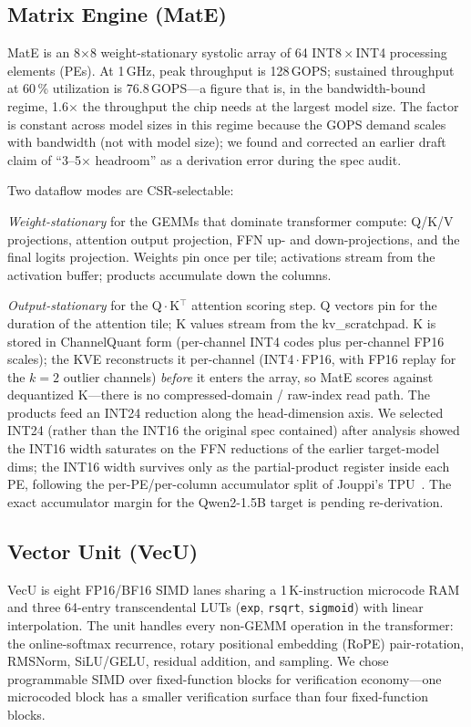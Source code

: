 \documentclass[conference]{IEEEtran}
\begin{document}
\subsection{Matrix Engine (MatE)}

MatE is an 8$\times$8 weight-stationary systolic array of 64 INT8\,$\times$\,INT4 processing elements (PEs). At 1\,GHz, peak throughput is 128\,GOPS; sustained throughput at 60\,\% utilization is 76.8\,GOPS---a figure that is, in the bandwidth-bound regime, 1.6$\times$ the throughput the chip needs at the largest model size. The factor is constant across model sizes in this regime because the GOPS demand scales with bandwidth (not with model size); we found and corrected an earlier draft claim of ``3--5$\times$ headroom'' as a derivation error during the spec audit.

Two dataflow modes are CSR-selectable:

\textit{Weight-stationary} for the GEMMs that dominate transformer compute: Q/K/V projections, attention output projection, FFN up- and down-projections, and the final logits projection. Weights pin once per tile; activations stream from the activation buffer; products accumulate down the columns.

\textit{Output-stationary} for the Q\,$\cdot$\,K$^\top$ attention scoring step. Q vectors pin for the duration of the attention tile; K values stream from the kv\_scratchpad. K is stored in ChannelQuant form (per-channel INT4 codes plus per-channel FP16 scales); the KVE reconstructs it per-channel (INT4\,$\cdot$\,FP16, with FP16 replay for the $k{=}2$ outlier channels) \emph{before} it enters the array, so MatE scores against dequantized K---there is no compressed-domain / raw-index read path. The products feed an INT24 reduction along the head-dimension axis. We selected INT24 (rather than the INT16 the original spec contained) after analysis showed the INT16 width saturates on the FFN reductions of the earlier target-model dims; the INT16 width survives only as the partial-product register inside each PE, following the per-PE/per-column accumulator split of Jouppi's TPU~\cite{jouppi_tpu,tpu_v4}. The exact accumulator margin for the Qwen2-1.5B target is pending re-derivation.

\subsection{Vector Unit (VecU)}

VecU is eight FP16/BF16 SIMD lanes sharing a 1\,K-instruction microcode RAM and three 64-entry transcendental LUTs (\texttt{exp}, \texttt{rsqrt}, \texttt{sigmoid}) with linear interpolation. The unit handles every non-GEMM operation in the transformer: the online-softmax recurrence, rotary positional embedding (RoPE) pair-rotation, RMSNorm, SiLU/GELU, residual addition, and sampling. We chose programmable SIMD over fixed-function blocks for verification economy---one microcoded block has a smaller verification surface than four fixed-function blocks.
\end{document}
